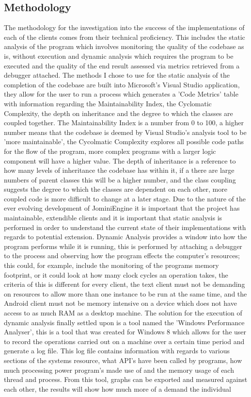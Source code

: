 \documentclass{article}
\begin{document}
\subsection{Methodology}
The methodology for the investigation into the success of the implementations of each of the clients comes from their technical proficiency. This includes the static analysis of the program which involves monitoring the quality of the codebase as is, without execution and dynamic analysis which requires the program to be executed and the quality of the end result assessed via metrics retrieved from a debugger attached. The methods I chose to use for the static analysis of the completion of the codebase are built into Microsoft's Visual Studio application, they allow for the user to run a process which generates a 'Code Metrics' table with information regarding the Maintainability Index, the Cyclomatic Complexity, the depth on inheritance and the degree to which the classes are coupled together. The Maintainability Index is a number from 0 to 100, a higher number means that the codebase is deemed by Visual Studio's analysis tool to be 'more maintainable', the Cycolmatic Complexity explores all possible code paths for the flow of the program, more complex programs with a larger logic component will have a higher value. The depth of inheritance is a reference to how many levels of inheritance the codebase has within it, if a there are large numbers of parent classes this will be a higher number, and the class coupling suggests the degree to which the classes are dependent on each other, more coupled code is more difficult to change at a later stage. Due to the nature of the ever evolving development of JominiEngine it is important that the project has maintainable, extendible clients and it is important that static analysis is performed in order to understand the current state of their implementations with regards to potential extension. Dynamic Analysis provides a window into how the program performs while it is running, this is performed by attaching a debugger to the process and observing how the program effects the computer's resources; this could, for example, include the monitoring of the programs memory footprint, or it could look at how many clock cycles an operation takes, the criteria of this is different for every client, the text client must not be demanding on resources to allow more than one instance to be run at the same time, and the Android client must not be memory intensive on a device which does not have access to as much RAM as a desktop machine. The solution for the execution of dynamic analysis finally settled upon is a tool named the 'Windows Performance Analyser', this is a tool that was created for Windows 8 which allows for the user to record the operations carried out on a machine over a certain time period and generate a log file. This log file contains information with regards to various sections of the systems resource, what API's have been called by programs, how much processing power program's made use of and the memory usage of each thread and process. From this tool, graphs can be exported and measured against each other, the results will show how much more of a demand the individual 
\end{document}
